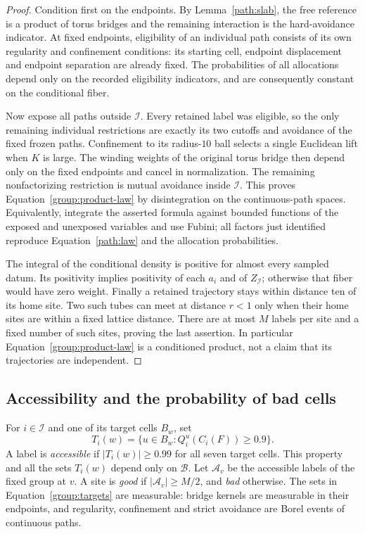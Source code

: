 \begin{proof}
Condition first on the endpoints.  By Lemma~\ref{path:slab}, the
free reference is a product of torus bridges and the remaining
interaction is the hard-avoidance indicator.  At fixed endpoints,
eligibility of an individual path consists of its own regularity and
confinement conditions: its starting cell, endpoint displacement and
endpoint separation are already fixed.  The probabilities of all
allocations depend only on the recorded eligibility indicators, and
are consequently constant on the conditional fiber.

Now expose all paths outside $\mathcal I$.  Every retained label was
eligible, so the only remaining individual restrictions are exactly
its two cutoffs and avoidance of the fixed frozen paths.  Confinement
to its radius-$10$ ball selects a single Euclidean lift when $K$ is
large.  The winding weights of the original torus bridge then depend
only on the fixed endpoints and cancel in normalization.  The remaining
nonfactorizing restriction is mutual avoidance inside $\mathcal I$.
This proves Equation~\eqref{group:product-law} by disintegration on
the continuous-path spaces.  Equivalently, integrate the asserted
formula against bounded functions of the exposed and unexposed
variables and use Fubini; all factors just identified reproduce
Equation~\eqref{path:law} and the allocation probabilities.

The integral of the conditional density is positive for almost every
sampled datum.  Its positivity implies positivity of each $a_i$ and
of $Z_{\mathcal I}$; otherwise that fiber would have zero weight.
Finally a retained trajectory stays within distance ten of its home
site.  Two such tubes can meet at distance $r<1$ only when their home
sites are within a fixed lattice distance.  There are at most $M$
labels per site and a fixed number of such sites, proving the last
assertion.  In particular Equation~\eqref{group:product-law} is a
conditioned product, not a claim that its trajectories are independent.
\end{proof}

\subsection{Accessibility and the probability of bad cells}

For $i\in\mathcal I$ and one of its target cells $B_w$, set
\begin{equation}\label{group:targets}
 T_i(w)=\{u\in B_w:Q_i^u(C_i(F))\ge0.9\}.
\end{equation}
A label is \emph{accessible} if $|T_i(w)|\ge0.99$ for all seven
target cells.  This property and all the sets $T_i(w)$ depend only
on $\mathcal B$.  Let $\mathcal A_v$ be the accessible labels of the
fixed group at $v$.  A site is \emph{good} if
$|\mathcal A_v|\ge M/2$, and \emph{bad} otherwise.  The sets in
Equation~\eqref{group:targets} are measurable: bridge kernels are
measurable in their endpoints, and regularity, confinement and strict
avoidance are Borel events of continuous paths.


